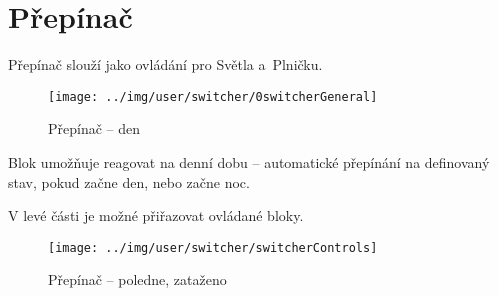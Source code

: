 
\section{Přepínač}

Přepínač slouží jako ovládání pro Světla a~Plničku.

\begin{figure}[!ht]\centering
\texttt{[image: ../img/user/switcher/0switcherGeneral]}

\caption{Přepínač -- den}
\label{fig:user_switcher_0switcherGeneral}

\end{figure}

\FloatBarrier

Blok umožňuje reagovat na denní dobu -- automatické přepínání na definovaný stav, pokud začne den, nebo začne noc.

V levé části je možné přiřazovat ovládané bloky.

\begin{figure}[!ht]\centering
\texttt{[image: ../img/user/switcher/switcherControls]}

\caption{Přepínač -- poledne, zataženo}
\label{fig:user_switcher_switcherControls}

\end{figure}


\FloatBarrier
